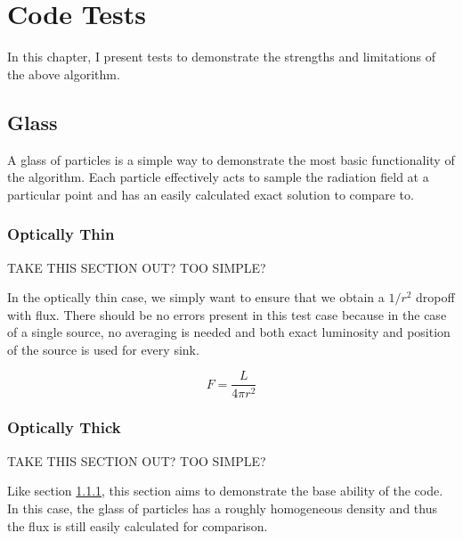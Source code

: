 \pagestyle{fancy}
\headheight 20pt
\chead{}
\lfoot{}
\cfoot{\thepage}
\rfoot{}
\renewcommand{\headrulewidth}{0.1pt}
\renewcommand{\footrulewidth}{0.1pt}


\chapter{Code Tests}
\label{chap:codetests}
\thispagestyle{fancy}

In this chapter, I present tests to demonstrate the strengths and limitations of the above algorithm.

\section{Glass}
\label{sec:glass}

A glass of particles is a simple way to demonstrate the most basic functionality of the algorithm. Each particle effectively acts to sample the radiation field at a particular point and has an easily calculated exact solution to compare to.

\subsection{Optically Thin}
\label{sec:thinglass}

{TAKE THIS SECTION OUT? TOO SIMPLE?}

In the optically thin case, we simply want to ensure that we obtain a $1/r^2$ dropoff with flux. There should be no errors present in this test case because in the case of a single source, no averaging is needed and both exact luminosity and position of the source is used for every sink.

\begin{equation}
\label{eq:flux}
F = \frac{L}{4\pi r^2}
\end{equation}

\subsection{Optically Thick}
\label{sec:thickglass}

{TAKE THIS SECTION OUT? TOO SIMPLE?}

Like section \ref{sec:thinglass}, this section aims to demonstrate the base ability of the code. In this case, the glass of particles has a roughly homogeneous density and thus the flux is still easily calculated for comparison.

